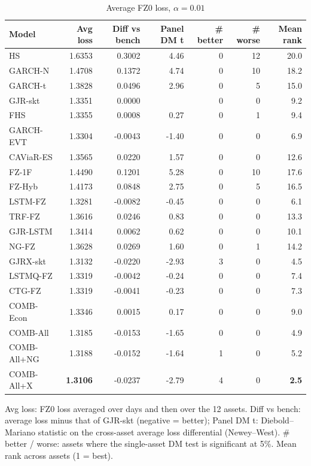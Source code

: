 \begin{table}[htbp]
\centering
\footnotesize
\caption{Average FZ0 loss, $\alpha=0.01$}
\label{tab:loss_a010}
\begin{tabular}{lrrrrrr}
\toprule
Model & Avg loss & Diff vs bench & Panel DM t & \# better & \# worse & Mean rank \\
\midrule
HS & 1.6353 & 0.3002 & 4.46 & 0 & 12 & 20.0 \\
GARCH-N & 1.4708 & 0.1372 & 4.74 & 0 & 10 & 18.2 \\
GARCH-t & 1.3828 & 0.0496 & 2.96 & 0 & 5 & 15.0 \\
GJR-skt & 1.3351 & 0.0000 &  & 0 & 0 & 9.2 \\
FHS & 1.3355 & 0.0008 & 0.27 & 0 & 1 & 9.4 \\
GARCH-EVT & 1.3304 & -0.0043 & -1.40 & 0 & 0 & 6.9 \\
CAViaR-ES & 1.3565 & 0.0220 & 1.57 & 0 & 0 & 12.6 \\
FZ-1F & 1.4490 & 0.1201 & 5.28 & 0 & 10 & 17.6 \\
FZ-Hyb & 1.4173 & 0.0848 & 2.75 & 0 & 5 & 16.5 \\
LSTM-FZ & 1.3281 & -0.0082 & -0.45 & 0 & 0 & 6.1 \\
TRF-FZ & 1.3616 & 0.0246 & 0.83 & 0 & 0 & 13.3 \\
GJR-LSTM & 1.3414 & 0.0062 & 0.62 & 0 & 0 & 10.1 \\
NG-FZ & 1.3628 & 0.0269 & 1.60 & 0 & 1 & 14.2 \\
GJRX-skt & 1.3132 & -0.0220 & -2.93 & 3 & 0 & 4.5 \\
LSTMQ-FZ & 1.3319 & -0.0042 & -0.24 & 0 & 0 & 7.4 \\
CTG-FZ & 1.3319 & -0.0041 & -0.23 & 0 & 0 & 7.3 \\
COMB-Econ & 1.3346 & 0.0015 & 0.17 & 0 & 0 & 9.0 \\
COMB-All & 1.3185 & -0.0153 & -1.65 & 0 & 0 & 4.9 \\
COMB-All+NG & 1.3188 & -0.0152 & -1.64 & 1 & 0 & 5.2 \\
COMB-All+X & \textbf{1.3106} & -0.0237 & -2.79 & 4 & 0 & \textbf{2.5} \\
\bottomrule
\end{tabular}
\par\smallskip\parbox{\linewidth}{\scriptsize Avg loss: FZ0 loss averaged over days and then over the 12 assets. Diff vs bench: average loss minus that of GJR-skt (negative = better); Panel DM t: Diebold--Mariano statistic on the cross-asset average loss differential (Newey--West). \# better / worse: assets where the single-asset DM test is significant at 5\%. Mean rank across assets (1 = best).}
\end{table}